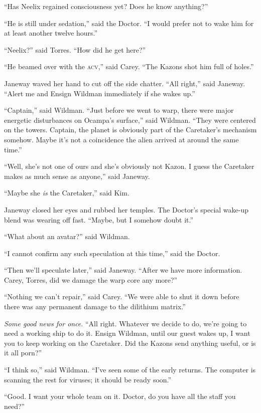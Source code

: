 \documentclass[twoside,letterpaper,12pt]{memoir}
\begin{document}
``Has Neelix regained consciousness yet? Does he know anything?'' 

``He is still under sedation,'' said the Doctor. ``I would prefer not to wake him for at least another twelve hours.'' 

``Neelix?'' said Torres. ``How did he get here?'' 

``He beamed over with the \textsc{acv},'' said Carey. ``The Kazons shot him full of holes.'' 

Janeway waved her hand to cut off the side chatter. ``All right,'' said Janeway. ``Alert me and Ensign Wildman immediately if she wakes up.'' 

``Captain,'' said Wildman. ``Just before we went to warp, there were major energetic disturbances on Ocampa's surface,'' said Wildman. ``They were centered on the towers. Captain, the planet is obviously part of the Caretaker's mechanism somehow. Maybe it's not a coincidence the alien arrived at around the same time.'' 

``Well, she's not one of ours and she's obviously not Kazon. I guess the Caretaker makes as much sense as anyone,'' said Janeway. 

``Maybe she \textit{is} the Caretaker,'' said Kim. 

Janeway closed her eyes and rubbed her temples. The Doctor's special wake-up blend was wearing off fast. ``Maybe, but I somehow doubt it.'' 

``What about an avatar?'' said Wildman. 

``I cannot confirm any such speculation at this time,'' said the Doctor. 

``Then we'll speculate later,'' said Janeway. ``After we have more information. Carey, Torres, did we damage the warp core any more?'' 

``Nothing we can't repair,'' said Carey. ``We were able to shut it down before there was any permanent damage to the dilithium matrix.'' 

\textit{Some good news for once}. ``All right. Whatever we decide to do, we're going to need a working ship to do it. Ensign Wildman, until our guest wakes up, I want you to keep working on the Caretaker. Did the Kazons send anything useful, or is it all porn?'' 

``I think so,'' said Wildman. ``I've seen some of the early returns. The computer is scanning the rest for viruses; it should be ready soon.'' 

``Good. I want your whole team on it. Doctor, do you have all the staff you need?'' 
\end{document}
